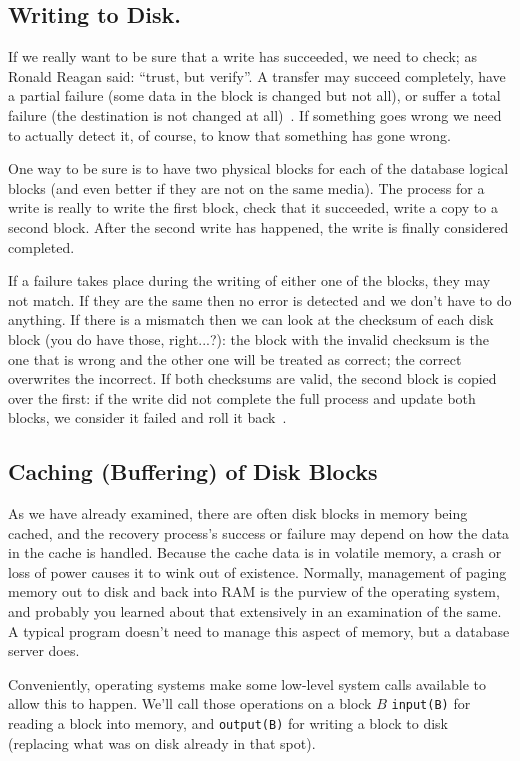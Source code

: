 \subsection*{Writing to Disk.}

If we really want to be sure that a write has succeeded, we need to check; as Ronald Reagan said: ``trust, but verify''. A transfer may succeed completely, have a partial failure (some data in the block is changed but not all), or suffer a total failure (the destination is not changed at all)~\cite{dsc}. If something goes wrong we need to actually detect it, of course, to know that something has gone wrong. 

One way to be sure is to have two physical blocks for each of the database logical blocks (and even better if they are not on the same media). The process for a write is really to write the first block, check that it succeeded, write a copy to a second block. After the second write has happened, the write is finally considered completed. 

If a failure takes place during the writing of either one of the blocks, they may not match. If they are the same then no error is detected and we don't have to do anything. If there is a mismatch then we can look at the checksum of each disk block (you do have those, right...?): the block with the invalid checksum is the one that is wrong and the other one will be treated as correct; the correct overwrites the incorrect. If both checksums are valid, the second block is copied over the first: if the write did not complete the full process and update both blocks, we consider it failed and roll it back~\cite{dsc}.

\subsection*{Caching (Buffering) of Disk Blocks}

As we have already examined, there are often disk blocks in memory being cached, and the recovery process's success or failure may depend on how the data in the cache is handled. Because the cache data is in volatile memory, a crash or loss of power causes it to wink out of existence. Normally, management of paging memory out to disk and back into RAM is the purview of the operating system, and probably you learned about that extensively in an examination of the same. A typical program doesn't need to manage this aspect of memory, but a database server does.

Conveniently, operating systems make some low-level system calls available to allow this to happen. We'll call those operations on a block $B$ \texttt{input(B)} for reading a block into memory, and \texttt{output(B)} for writing a block to disk (replacing what was on disk already in that spot). 

